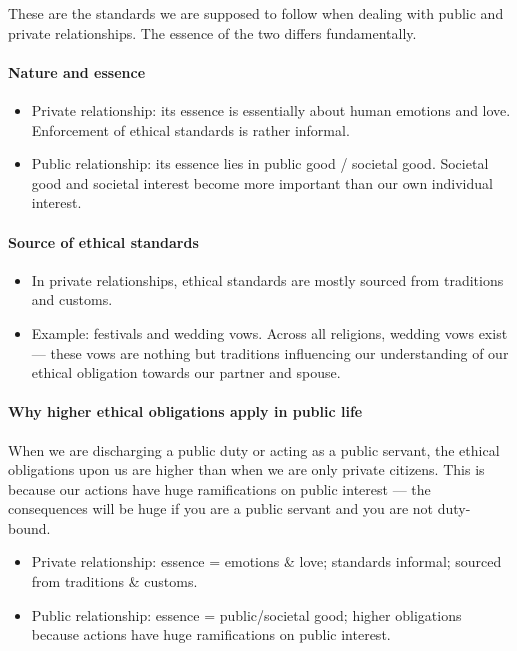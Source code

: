 These are the standards we are supposed to follow when dealing with public and private relationships. The essence of the two differs fundamentally.

\paragraph{Nature and essence}
\begin{itemize}
\item Private relationship: its essence is essentially about human emotions and love. Enforcement of ethical standards is rather informal.
\item Public relationship: its essence lies in public good / societal good. Societal good and societal interest become more important than our own individual interest.
\end{itemize}

\paragraph{Source of ethical standards}
\begin{itemize}
\item In private relationships, ethical standards are mostly sourced from traditions and customs.
\item Example: festivals and wedding vows. Across all religions, wedding vows exist --- these vows are nothing but traditions influencing our understanding of our ethical obligation towards our partner and spouse.
\end{itemize}

\paragraph{Why higher ethical obligations apply in public life} When we are discharging a public duty or acting as a public servant, the ethical obligations upon us are higher than when we are only private citizens. This is because our actions have huge ramifications on public interest --- the consequences will be huge if you are a public servant and you are not duty-bound.

\begin{ComparisonBox}
\begin{itemize}
\item Private relationship: essence = emotions \& love; standards informal; sourced from traditions \& customs.
\item Public relationship: essence = public/societal good; higher obligations because actions have huge ramifications on public interest.
\end{itemize}
\end{ComparisonBox}


